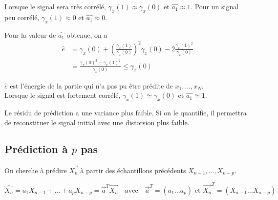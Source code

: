 \documentclass[main.tex]{subfiles}
\begin{document}
\begin{rem}
Lorsque le signal sera très corrélé, $\gamma_x(1) \approx \gamma_x(0)$ et $\hat{a_1} \approx 1$. Pour un signal peu corrélé, $\gamma_x(1) \approx 0$ et $\hat{a_1} \approx 0$.
\end{rem}

Pour la valeur de $\hat{a_1}$ obtenue, on a
\begin{align*}
\hat{e} & = \gamma_x(0) + (\frac{\gamma_x(1)}{\gamma_x(0)})^2 \gamma_x(0) - 2 \frac{\gamma_x(1)^2}{\gamma_x(0)} \\
& = \frac{\gamma_x(0)^2-\gamma_x(1)^2}{\gamma_x(0)} \leq \gamma_x(0)
\end{align*}

$\hat{e}$ est l'énergie de la partie qui n'a pas pu être prédite de $x_1,\dots,x_N$.\\

Lorsque le signal est fortement corrélé, $\gamma_x(1)\simeq \gamma_x(0)$ et  $\hat{a_1}\simeq 1$.

Le résidu de prédiction a une variance plus faible. Si on le quantifie, il permettra de reconstituer le signal initial avec une distorsion plus faible.
\subsection{Prédiction à $p$ pas}


On cherche à prédire $\vec{X_n}$ à partir des échantillons précédents $X_{n-1},\dots,X_{n-p}$.

\newcommand{\ap}{\vec{a}}
\newcommand{\Xn}{\vec{X_n}}
\newcommand{\cp}{\vec{c}}
\newcommand{\Rp}{\vec{R}}

\[ \hat{X_n} = a_1 X_{n-1} + \dots + a_pX_{n-p} = \ap^T \Xn \quad\text{avec}\quad \ap^T=(a_1\dots a_p) \text{ et } \Xn^T = (X_{n-1} \dots X_{n-p})\]
\end{document}
